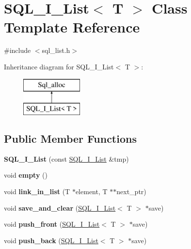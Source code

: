 \hypertarget{classSQL__I__List}{}\section{S\+Q\+L\+\_\+\+I\+\_\+\+List$<$ T $>$ Class Template Reference}
\label{classSQL__I__List}


{\ttfamily \#include $<$sql\+\_\+list.\+h$>$}

Inheritance diagram for S\+Q\+L\+\_\+\+I\+\_\+\+List$<$ T $>$\+:\begin{figure}[H]
\begin{center}
\leavevmode
\includegraphics[height=2.000000cm]{classSQL__I__List}
\end{center}
\end{figure}
\subsection*{Public Member Functions}
\begin{DoxyCompactItemize}
\item 
\mbox{\label{classSQL__I__List_ad0dee940c35877d4332bd2dd26151c9a}} 
{\bfseries S\+Q\+L\+\_\+\+I\+\_\+\+List} (const \mbox{\hyperlink{classSQL__I__List}{S\+Q\+L\+\_\+\+I\+\_\+\+List}} \&tmp)
\item 
\mbox{\label{classSQL__I__List_a08465e0794405462be9e1cd1e221fb6d}} 
void {\bfseries empty} ()
\item 
\mbox{\label{classSQL__I__List_a4638ca19e15c687e66a578bc8a1622c4}} 
void {\bfseries link\+\_\+in\+\_\+list} (T $\ast$element, T $\ast$$\ast$next\+\_\+ptr)
\item 
\mbox{\label{classSQL__I__List_a17a9898e64afa8821e30a53dcedad43e}} 
void {\bfseries save\+\_\+and\+\_\+clear} (\mbox{\hyperlink{classSQL__I__List}{S\+Q\+L\+\_\+\+I\+\_\+\+List}}$<$ T $>$ $\ast$save)
\item 
\mbox{\label{classSQL__I__List_a3a29ec49d93f06286129f7f81e3b2d87}} 
void {\bfseries push\+\_\+front} (\mbox{\hyperlink{classSQL__I__List}{S\+Q\+L\+\_\+\+I\+\_\+\+List}}$<$ T $>$ $\ast$save)
\item 
\mbox{\label{classSQL__I__List_a40602a5f0db6969c9f43b02d101cd93a}} 
void {\bfseries push\+\_\+back} (\mbox{\hyperlink{classSQL__I__List}{S\+Q\+L\+\_\+\+I\+\_\+\+List}}$<$ T $>$ $\ast$save)
\end{DoxyCompactItemize}
